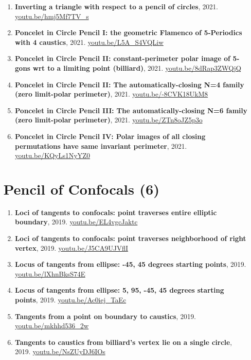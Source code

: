 \documentclass[12pt]{article}
\begin{document}
\begin{enumerate}[resume]
\item \textbf{Inverting a triangle with respect to a pencil of circles}, 2021. \href{https://youtu.be/hmj5Mf7TV_s}{\url{youtu.be/hmj5Mf7TV\_s}}
\item \textbf{Poncelet in Circle Pencil I: the geometric Flamenco of 5-Periodics with 4 caustics}, 2021. \href{https://youtu.be/L5A_S4VQLiw}{\url{youtu.be/L5A\_S4VQLiw}}
\item \textbf{Poncelet in Circle Pencil II: constant-perimeter polar image of 5-gons wrt to a limiting point (billiard)}, 2021. \href{https://youtu.be/8dRap3ZWQjQ}{\url{youtu.be/8dRap3ZWQjQ}}
\item \textbf{Poncelet in Circle Pencil II: The automatically-closing N=4 family (zero limit-polar perimeter)}, 2021. \href{https://youtu.be/-8CVK18UkM8}{\url{youtu.be/-8CVK18UkM8}}
\item \textbf{Poncelet in Circle Pencil III: The automatically-closing N=6 family (zero limit-polar perimeter)}, 2021. \href{https://youtu.be/ZTn8oJZ5p3o}{\url{youtu.be/ZTn8oJZ5p3o}}
\item \textbf{Poncelet in Circle Pencil IV: Polar images of all closing permutations have same invariant perimeter}, 2021. \href{https://youtu.be/KQyLs1NyYZ0}{\url{youtu.be/KQyLs1NyYZ0}}
\end{enumerate}

\section{Pencil of Confocals (6)}

\begin{enumerate}[resume]
\item \textbf{Loci of tangents to confocals: point traverses entire elliptic boundary}, 2019. \href{https://youtu.be/EL4vgcJaktc}{\url{youtu.be/EL4vgcJaktc}}
\item \textbf{Loci of tangents to confocals: point traverses neighborhood of right vertex}, 2019. \href{https://youtu.be/J5CA9UJVflI}{\url{youtu.be/J5CA9UJVflI}}
\item \textbf{Locus of tangents from ellipse: -45, 45 degrees starting points}, 2019. \href{https://youtu.be/lXhnBksS74E}{\url{youtu.be/lXhnBksS74E}}
\item \textbf{Locus of tangents from ellipse: 5, 95, -45, 45 degrees starting points}, 2019. \href{https://youtu.be/Ac0iej_TaEc}{\url{youtu.be/Ac0iej\_TaEc}}
\item \textbf{Tangents from a point on boundary to caustics}, 2019. \href{https://youtu.be/mkhhd536_2w}{\url{youtu.be/mkhhd536\_2w}}
\item \textbf{Tangents to caustics from billiard's vertex lie on a single circle}, 2019. \href{https://youtu.be/NsZUyDJ6IOs}{\url{youtu.be/NsZUyDJ6IOs}}
\end{enumerate}
\end{document}
